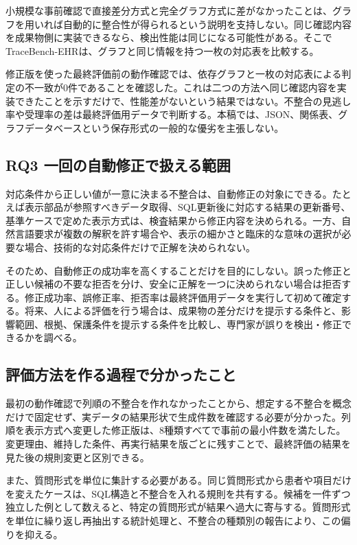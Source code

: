 \documentclass[a4paper]{jsarticle}
\begin{document}
小規模な事前確認で直接差分方式と完全グラフ方式に差がなかったことは、グラフを用いれば自動的に整合性が得られるという説明を支持しない。同じ確認内容を成果物側に実装できるなら、検出性能は同じになる可能性がある。そこでTraceBench-EHRは、グラフと同じ情報を持つ一枚の対応表を比較する。

修正版を使った最終評価前の動作確認では、依存グラフと一枚の対応表による判定の不一致が0件であることを確認した。これは二つの方法へ同じ確認内容を実装できたことを示すだけで、性能差がないという結果ではない。不整合の見逃し率や受理率の差は最終評価用データで判断する。本稿では、JSON、関係表、グラフデータベースという保存形式の一般的な優劣を主張しない。

\subsection{RQ3 一回の自動修正で扱える範囲}

対応条件から正しい値が一意に決まる不整合は、自動修正の対象にできる。たとえば表示部品が参照すべきデータ取得、SQL更新後に対応する結果の更新番号、基準ケースで定めた表示方式は、検査結果から修正内容を決められる。一方、自然言語要求が複数の解釈を許す場合や、表示の細かさと臨床的な意味の選択が必要な場合、技術的な対応条件だけで正解を決められない。

そのため、自動修正の成功率を高くすることだけを目的にしない。誤った修正と正しい候補の不要な拒否を分け、安全に正解を一つに決められない場合は拒否する。修正成功率、誤修正率、拒否率は最終評価用データを実行して初めて確定する。将来、人による評価を行う場合は、成果物の差分だけを提示する条件と、影響範囲、根拠、保護条件を提示する条件を比較し、専門家が誤りを検出・修正できるかを調べる。

\subsection{評価方法を作る過程で分かったこと}

最初の動作確認で列順の不整合を作れなかったことから、想定する不整合を概念だけで固定せず、実データの結果形状で生成件数を確認する必要が分かった。列順を表示方式へ変更した修正版は、8種類すべてで事前の最小件数を満たした。変更理由、維持した条件、再実行結果を版ごとに残すことで、最終評価の結果を見た後の規則変更と区別できる。

また、質問形式を単位に集計する必要がある。同じ質問形式から患者や項目だけを変えたケースは、SQL構造と不整合を入れる規則を共有する。候補を一件ずつ独立した例として数えると、特定の質問形式が結果へ過大に寄与する。質問形式を単位に繰り返し再抽出する統計処理と、不整合の種類別の報告により、この偏りを抑える。
\end{document}
